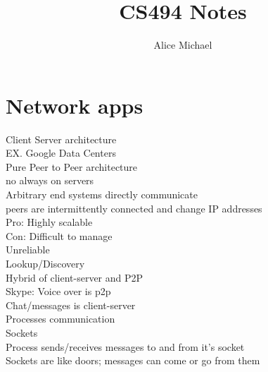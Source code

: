 \chead{}
\author{Alice Michael}
\title{CS494 Notes}
\date{}









\section*{Network apps}

Client Server architecture\\
EX. Google Data Centers\\

Pure Peer to Peer architecture\\
no always on servers\\
Arbitrary end systems directly communicate\\
peers are intermittently connected and change IP addresses\\

\noindent Pro: Highly scalable \\
\noindent Con: Difficult to manage\\
\indent\indent Unreliable\\
\indent\indent Lookup/Discovery\\


Hybrid of client-server and P2P\\
\noindent Skype:
\indent\indent Voice over is p2p\\
\indent\indent Chat/messages is client-server\\

Processes communication\\

Sockets\\
Process sends/receives messages to and from it's socket\\
Sockets are like doors; messages can come or go from them\\

